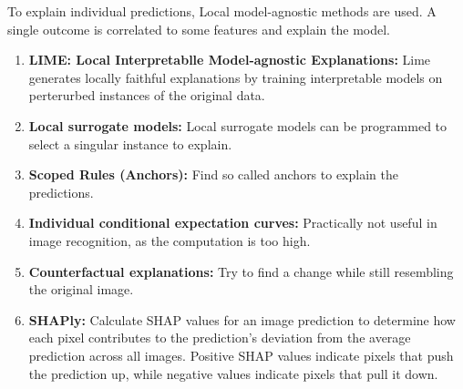 To explain individual predictions, Local model-agnostic methods are used. A single outcome is correlated to some features and explain the model.


\begin{enumerate}
	\item \textbf{LIME: Local Interpretablle Model-agnostic Explanations:} Lime generates locally faithful explanations by training interpretable models on perterurbed instances of the original data.
	\item \textbf{Local surrogate models:} Local surrogate models can be programmed to select a singular instance to explain.
	\item \textbf{Scoped Rules (Anchors):} Find so called anchors to explain the predictions.
	\item \textbf{Individual conditional expectation curves:} Practically not useful in image recognition, as the computation is too high.
	\item \textbf{Counterfactual explanations:} Try to find a change while still resembling the original image.
	\item \textbf{SHAPly:} Calculate SHAP values for an image prediction to determine how each pixel contributes to the prediction's deviation from the average prediction across all images.
	Positive SHAP values indicate pixels that push the prediction up, while negative values indicate pixels that pull it down.
\end{enumerate}



